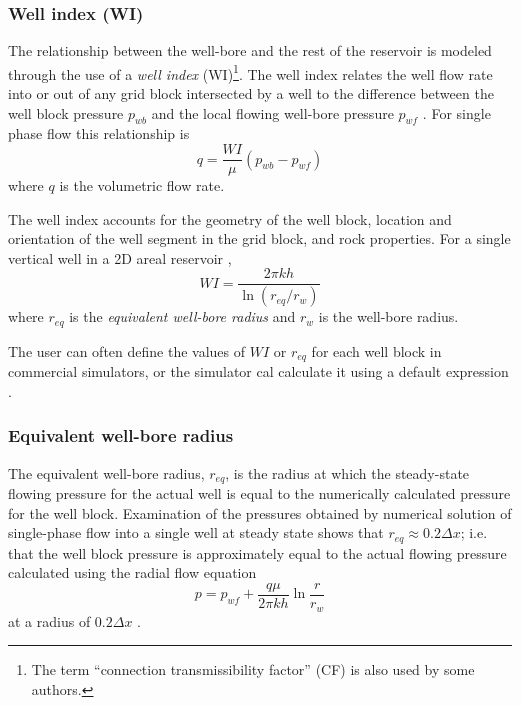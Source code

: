 \subsubsection{Well index (WI)} %
\label{ssub:well_index_}

The relationship between the well-bore and the rest of the reservoir is modeled through the use of a \emph{well index} (WI)\footnote{The term ``connection transmissibility factor'' (CF) is also used by some authors\cite{Peaceman2003New,Schlumberger2013Eclipse}.}. The well index relates the well flow rate into or out of any grid block intersected by a well to the difference between the well block pressure $p_{wb}$ and the local flowing well-bore pressure $p_{wf}$ \cite{Wolfsteiner2003Calculation}. For single phase flow this relationship is
\begin{equation}
    \label{eq:wolfsteiner-well-index-multiple-blocks}
    q = \frac{WI}{\mu} \left( p_{wb} - p_{wf} \right)
\end{equation}
where $q$ is the volumetric flow rate.

The well index accounts for the geometry of the well block, location and orientation of the well segment in the grid block, and rock properties. For a single vertical well in a 2D areal reservoir \cite{Peaceman2003New},
\begin{equation}
    \label{eq:well-index-intro}
    WI = \frac{2\pi kh}{\ln \left(r_{eq}/r_{w}\right)}
\end{equation}
where $r_{eq}$ is the \emph{equivalent well-bore radius} and $r_w$ is the well-bore radius.

The user can often define the values of $WI$ or $r_{eq}$ for each well block in commercial simulators, or the simulator cal calculate it using a default expression \cite{Peaceman2003New}.

\subsubsection{Equivalent well-bore radius} %
\label{ssub:equivalent_well-bore_radius}
The equivalent well-bore radius, $r_{eq}$, is the radius at which the steady-state flowing pressure for the actual well is equal to the numerically calculated pressure for the well block. Examination of the pressures obtained by numerical solution of single-phase flow into a single well at steady state shows that $r_{eq} \approx 0.2 \Delta x$; i.e. that the well block pressure is approximately equal to the actual flowing pressure calculated using the radial flow equation \cite{Dake1978Developments}
\begin{equation}
    p = p_{wf} + \frac{q\mu}{2\pi kh} \ln{\frac{r}{r_w}}
\end{equation}
 at a radius of $0.2 \Delta x$ \cite{Peaceman1978Interpretation}.


